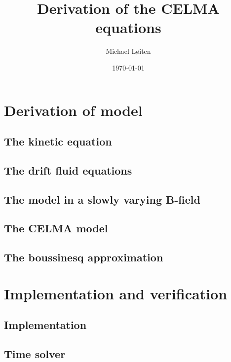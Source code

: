 \documentclass[12pt,a4paper,oneside,openright]{report} %
\title{\vspace{-8ex}Derivation of the CELMA equations\vspace{-1ex}}
\author{Michael L{\o}iten}
\date{\vspace{-2ex}\today}
\begin{document}
\maketitle
%
\part{Derivation of model}
\chapter{The kinetic equation}

%
\chapter{The drift fluid equations}
\label{chap:drift-order}


\chapter{The model in a slowly varying B-field}


\chapter{The CELMA model}
\label{chap:CELMA}






\chapter{The boussinesq approximation}


\part{Implementation and verification}
\chapter{Implementation}

\chapter{Time solver}

\end{document}
